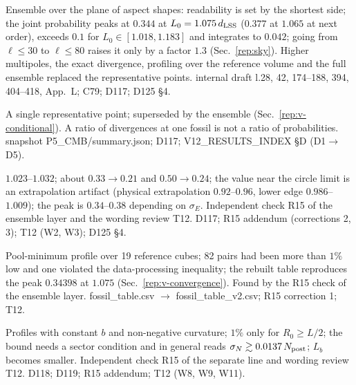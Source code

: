 \begin{description}
{Ensemble over the plane of aspect shapes: readability is set by the shortest side; the joint probability peaks at $0.344$ at $L_0=1.075\,d_{\mathrm{LSS}}$ ($0.377$ at $1.065$ at next order), exceeds $0.1$ for $L_0\in[1.018,1.183]$ and integrates to $0.042$; going from $\ell\le30$ to $\ell\le80$ raises it only by a factor $1.3$ (Sec.~\ref{rep:sky}).}
{Higher multipoles, the exact divergence, profiling over the reference volume and the full ensemble replaced the representative points.}
{internal draft l.28, 42, 174--188, 394, 404--418, App.~L; C79; D117; D125 \S4.}

{A single representative point; superseded by the ensemble (Sec.~\ref{rep:v-conditional}).}
{A ratio of divergences at one fossil is not a ratio of probabilities.}
{snapshot P5\_CMB/summary.json; D117; V12\_RESULTS\_INDEX \S D (D1$\to$D5).}

{$1.023$--$1.032$; about $0.33\to0.21$ and $0.50\to0.24$; the value near the circle limit is an extrapolation artifact (physical extrapolation $0.92$--$0.96$, lower edge $0.986$--$1.009$); the peak is $0.34$--$0.38$ depending on $\sigma_E$.}
{Independent check R15 of the ensemble layer and the wording review T12.}
{D117; R15 addendum (corrections 2, 3); T12 (W2, W3); D125 \S4.}

{Pool-minimum profile over 19 reference cubes; 82 pairs had been more than $1\%$ low and one violated the data-processing inequality; the rebuilt table reproduces the peak $0.34398$ at $1.075$ (Sec.~\ref{rep:v-convergence}).}
{Found by the R15 check of the ensemble layer.}
{fossil\_table.csv $\to$ fossil\_table\_v2.csv; R15 correction 1; T12.}

{Profiles with constant $b$ and non-negative curvature; $1\%$ only for $R_0\ge L/2$; the bound needs a sector condition and in general reads $\sigma_N\gtrsim0.0137\,N_{\rm post}$; $L_b$ becomes smaller.}
{Independent check R15 of the separate line and wording review T12.}
{D118; D119; R15 addendum; T12 (W8, W9, W11).}


\end{description}
